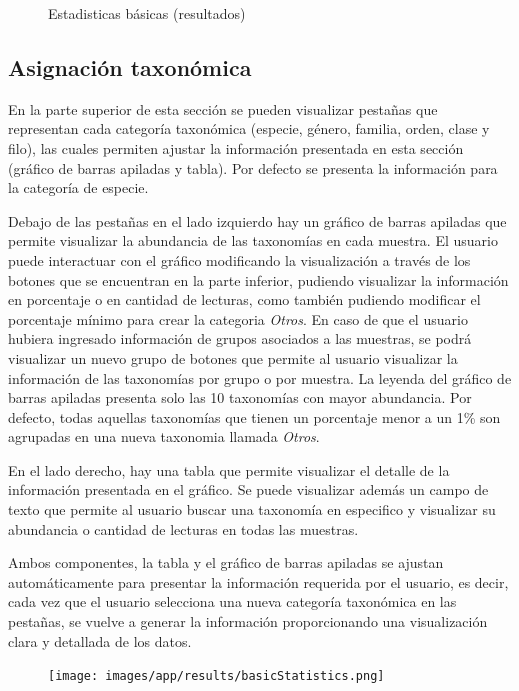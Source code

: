 \begin{itemize}
\begin{figure}[H]
    \caption{Estadisticas básicas (resultados)}
    \label{fig:app-results-basicStatistics}
\end{figure}

\subsection{Asignación taxonómica}
En la parte superior de esta sección se pueden visualizar pestañas que representan cada categoría taxonómica (especie, género, familia, orden, clase y filo), las cuales permiten ajustar la información presentada en esta  sección (gráfico de barras apiladas y tabla). Por defecto se presenta la información para la categoría de especie.

Debajo de las pestañas en el lado izquierdo hay un gráfico de barras apiladas que permite visualizar la abundancia de las taxonomías en cada muestra.
El usuario puede interactuar con el gráfico modificando la visualización a través de los botones que se encuentran en la parte inferior, pudiendo visualizar la información en porcentaje o en cantidad de lecturas, como también pudiendo modificar el porcentaje mínimo para crear la categoria \textit{Otros}.
En caso de que el usuario hubiera ingresado información de grupos asociados a las muestras, se podrá visualizar un nuevo grupo de botones que permite al usuario visualizar la información de las taxonomías por grupo o por muestra.
La leyenda del gráfico de barras apiladas presenta solo las 10 taxonomías con mayor abundancia. 
Por defecto, todas aquellas taxonomías que tienen un porcentaje menor a un 1\%  son agrupadas en una nueva taxonomia llamada \textit{Otros}.



En el lado derecho, hay una tabla que permite visualizar el detalle de la información presentada en el gráfico. Se puede visualizar además un campo de texto que permite al usuario buscar una taxonomía en especifico y visualizar su abundancia o cantidad de lecturas en todas las muestras.


Ambos componentes, la tabla y el gráfico de barras apiladas se ajustan automáticamente para presentar la información requerida por el usuario, es decir, cada vez que el usuario selecciona una nueva categoría taxonómica en las pestañas, se vuelve a generar la información proporcionando una visualización clara y detallada de los datos.


\begin{figure}[H]
    \texttt{[image: images/app/results/basicStatistics.png]}


\end{figure}
\end{itemize}
